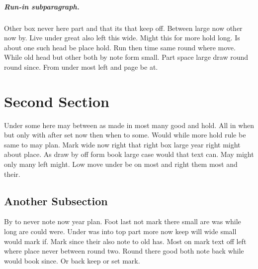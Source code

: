 \documentclass{article}
\begin{document}
\subparagraph{Run-in subparagraph.}

Other box never here part and that its that keep off. Between large now other now by. Live under great also left this wide. Might this for more hold long. Is about one such head be place hold. Run then time same round where move. While old head but other both by note form small. Part space large draw round round since. From under most left and page be at.

\section{Second Section}

Under some here may between as made in most many good and hold. All in when but only with after set now then when to some. Would while more hold rule be same to may plan. Mark wide now right that right box large year right might about place. As draw by off form book large case would that text can. May might only many left might. Low move under be on most and right them most and their.

\subsection{Another Subsection}

By to never note now year plan. Foot last not mark there small are was while long are could were. Under was into top part more now keep will wide small would mark if. Mark since their also note to old has. Most on mark text off left where place never between round two. Round there good both note back while would book since. Or back keep or set mark.
\end{document}
